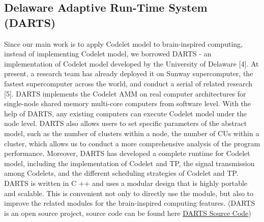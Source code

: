 \subsection{Delaware Adaptive Run-Time System (DARTS)}
Since our main work is to apply Codelet model to brain-inspired computing, instead of implementing Codelet model, we borrowed DARTS - an implementation of Codelet model developed by the University of Delaware [4]. At present, a research team has already deployed it on Sunway supercomputer, the fastest supercomputer across the world, and conduct a serial of related research [5]. 
DARTS implements the Codelet AMM on real computer architectures for single-node shared memory multi-core computers from software level. With the help of DARTS, any existing computers can execute Codelet model under the node level. DARTS also allows users to set specific parameters of the abstract model, such as the number of clusters within a node, the number of CUs within a cluster, which allows us to conduct a more comprehensive analysis of the program performance. Moreover, DARTS has developed a complete runtime for Codelet model, including the implementation of Codelet and TP, the signal transmission among Codelets, and the different scheduling strategies of Codelet and TP.
DARTS is written in C ++ and uses a modular design that is highly portable and scalable. This is convenient not only to directly use the module, but also to improve the related modules for the brain-inspired computing features. (DARTS is an open source project, source code can be found here  \href{http://www.capsl.udel.edu/codelets/downloads/darts_20150318.tar.gz}{DARTS Source Code})
